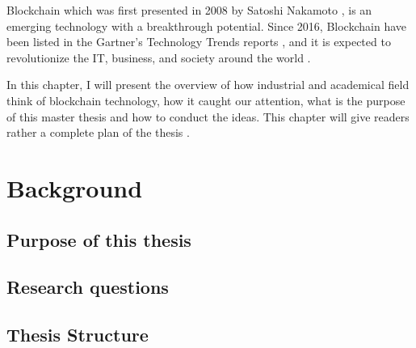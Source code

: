 Blockchain which was first presented in 2008 by Satoshi Nakamoto \cite{sn}, is an emerging technology with a breakthrough potential. Since 2016, Blockchain have been listed in the Gartner’s Technology Trends reports \cite{c-1}, and it is expected to revolutionize the IT, business, and society around the world \cite{c-Deloi}.

In this chapter, I will present the overview of how industrial and academical field think of blockchain technology, how it caught our attention, what is the purpose of this master thesis and how to conduct the ideas. This chapter will give readers rather a complete plan of the thesis .\\

\section{Background}

\subsection{Purpose of this thesis}


\subsection{Research questions}
%
%	
%	
%	
%	
%	


\subsection{Thesis Structure}